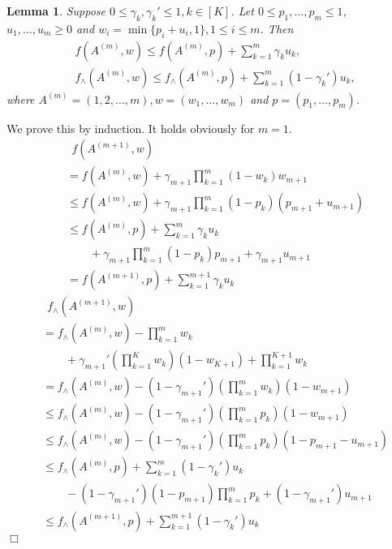 \documentclass{article}
\newtheorem{lemma}[theorem]{Lemma}%
\newenvironment{proof}{\noindent {\textbf{Proof. }}}{$\Box$ \medskip}
\begin{document}
\begin{lemma}
\label{lem:estimateTech}
Suppose $0 \leq \gamma_k, \gamma_k' \leq 1, k \in [K]$. Let $0 \leq p_1, \ldots, p_m \leq 1$, $u_1, \ldots, u_m \geq 0$ and $w_i = \min\{p_i + u_i, 1\}, 1 \leq i \leq m$. Then
\begin{align*}
&f(A^{(m)}, w) \leq f(A^{(m)}, p) + \sum_{k=1}^{m} \gamma_k u_k,\\
&f_{\wedge}(A^{(m)}, w) \leq f_{\wedge}(A^{(m)}, p) + \sum_{k=1}^{m} (1 - \gamma_k') u_k,
\end{align*}
where $A^{(m)} = (1, 2, \ldots, m), w = (w_1, \ldots, w_m)$ and $p = (p_1, \ldots, p_m)$.
\end{lemma}
\begin{proof}
We prove this by induction. It holds obviously for $m = 1$.
\begin{align*}
&~~f(A^{(m+1)}, w)\\
&= f(A^{(m)}, w) + \gamma_{m+1}\prod_{k=1}^m(1 - w_k) w_{m+1}\\
&\leq f(A^{(m)}, w) +  \gamma_{m+1} \prod_{k=1}^m(1 - p_k) (p_{m+1} + u_{m+1})\\
&\leq f(A^{(m)}, p) + \sum_{k=1}^m \gamma_k u_k \\
&\qquad + \gamma_{m+1} \prod_{k=1}^m(1 - p_k) p_{m+1} + \gamma_{m+1} u_{m+1}\\
&= f(A^{(m+1)}, p) + \sum_{k=1}^{m+1} \gamma_k u_k
\end{align*}
\begin{align*}
&~~f_{\wedge}(A^{(m+1)}, w) \\
&= f_{\wedge}(A^{(m)}, w) -\prod_{k=1}^{m} w_k \\
&\qquad+ \gamma_{m+1}' (\prod_{k=1}^{K} w_k) (1 - w_{K+1})+ \prod_{k=1}^{K+1} w_k\\
&= f_{\wedge}(A^{(m)}, w) - (1 - \gamma_{m+1}') (\prod_{k=1}^{m} w_k) (1 - w_{m+1})\\
&\leq f_{\wedge}(A^{(m)}, w) - (1 - \gamma_{m+1}') (\prod_{k=1}^{m} p_k) (1 - w_{m+1})\\
&\leq f_{\wedge}(A^{(m)}, w) -(1 - \gamma_{m+1}') (\prod_{k=1}^{m} p_k)  (1 - p_{m+1} - u_{m+1})\\
&\leq f_{\wedge}(A^{(m)}, p) +  \sum_{k=1}^{m} (1 - \gamma_k') u_k \\
&\qquad - (1 - \gamma_{m+1}') (1 - p_{m+1}) \prod_{k=1}^{m} p_k + (1 - \gamma_{m+1}') u_{m+1}\\
&\leq f_{\wedge}(A^{(m+1)}, p) + \sum_{k=1}^{m+1} (1 - \gamma_k') u_k
\end{align*}
\end{proof}
\end{document}
